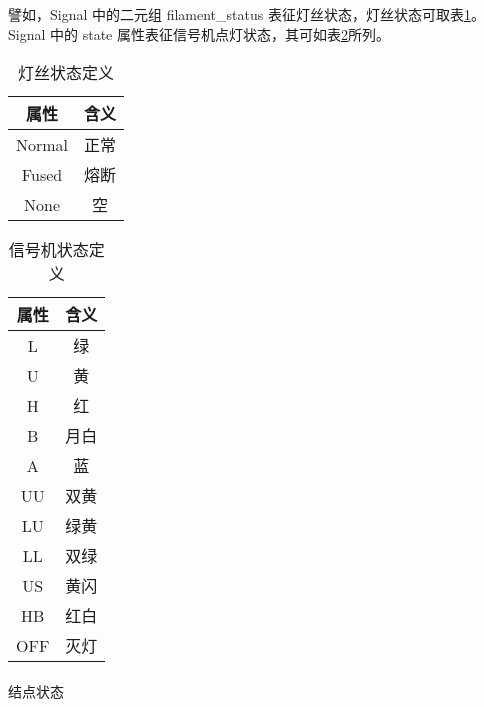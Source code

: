 譬如，Signal 中的二元组 filament\_status 表征灯丝状态，灯丝状态可取表\ref{fila_state}。
Signal 中的 state 属性表征信号机点灯状态，其可如表\ref{sgn_state}所列。
\begin{table}[htpb!]
    \centering
    \caption{\label{fila_state}灯丝状态定义}
    \begin{threeparttable}
        \begin{tabular}{cc}
            \toprule
            属性   & 含义 \\
            \midrule
            Normal & 正常 \\
            Fused  & 熔断 \\
            None   & 空   \\
            \bottomrule
        \end{tabular}
    \end{threeparttable}
\end{table}
\begin{table}[htpb!]
    \centering
    \caption{\label{sgn_state}信号机状态定义}
    \begin{threeparttable}
        \begin{tabular}{cc}
            \toprule
            属性 & 含义 \\
            \midrule
            L    & 绿   \\
            U    & 黄   \\
            H    & 红   \\
            B    & 月白 \\
            A    & 蓝   \\
            UU   & 双黄 \\
            LU   & 绿黄 \\
            LL   & 双绿 \\
            US   & 黄闪 \\
            HB   & 红白 \\
            OFF  & 灭灯 \\
            \bottomrule
        \end{tabular}
    \end{threeparttable}
\end{table}

\paragraph{}结点状态

